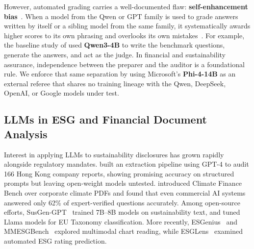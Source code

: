 \documentclass[11pt,letterpaper]{article}
\newcommand{\model}[1]{\textbf{#1}}
\begin{document}
However, automated grading carries a well-documented flaw: \textbf{self-enhancement bias}~\citep{gu2024survey,zhu2025judgelm,kim2024prometheus}. When a model from the Qwen or GPT family is used to grade answers written by itself or a sibling model from the same family, it systematically awards higher scores to its own phrasing and overlooks its own mistakes~\citep{liu2023geval}. For example, the baseline study of \citet{saad2026empirical} used \model{Qwen3-4B} to write the benchmark questions, generate the answers, and act as the judge. In financial and sustainability assurance, independence between the preparer and the auditor is a foundational rule. We enforce that same separation by using Microsoft's \model{Phi-4-14B} as an external referee that shares no training lineage with the Qwen, DeepSeek, OpenAI, or Google models under test.

\subsection{LLMs in ESG and Financial Document Analysis}
Interest in applying LLMs to sustainability disclosures has grown rapidly alongside regulatory mandates. \citet{zou2025esgreveal} built an extraction pipeline using GPT-4 to audit 166 Hong Kong company reports, showing promising accuracy on structured prompts but leaving open-weight models untested. \citet{mankour2025climate} introduced Climate Finance Bench over corporate climate PDFs and found that even commercial AI systems answered only 62\% of expert-verified questions accurately. Among open-source efforts, SusGen-GPT~\citep{wu2025susgen} trained 7B--8B models on sustainability text, and \citet{birti2025optimizing} tuned Llama models for EU Taxonomy classification. More recently, ESGenius~\citep{he2025esgenius} and MMESGBench~\citep{zhang2025mmesgbench} explored multimodal chart reading, while ESGLens~\citep{yang2026esglens} examined automated ESG rating prediction.
\end{document}
